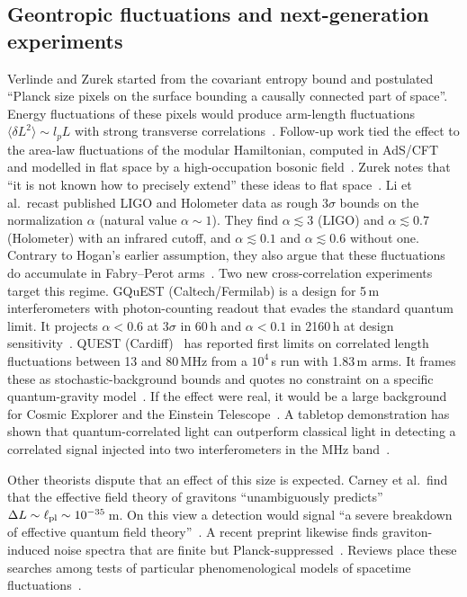 \subsection{Geontropic fluctuations and next-generation experiments}

Verlinde and Zurek started from the covariant entropy bound and postulated
``Planck size pixels on the surface bounding a causally connected part of
space''. Energy fluctuations of these pixels would produce arm-length
fluctuations $\langle\delta L^2\rangle\sim l_pL$ with strong transverse
correlations~\cite{Verlinde2021observational}. Follow-up work tied the effect to
the area-law fluctuations of the modular Hamiltonian, computed in AdS/CFT and
modelled in flat space by a high-occupation bosonic field~\cite{Verlinde2020spacetime,Zurek2022vacuum,Verlinde2022modular}.
Zurek notes that ``it is not known how to precisely extend'' these ideas to flat
space~\cite{Zurek2022vacuum}. Li et al.\ recast published LIGO and Holometer data
as rough $3\sigma$ bounds on the normalization $\alpha$ (natural value
$\alpha\sim1$). They find $\alpha\lesssim3$ (LIGO) and $\alpha\lesssim0.7$
(Holometer) with an infrared cutoff, and $\alpha\lesssim0.1$ and
$\alpha\lesssim0.6$ without one. Contrary to Hogan's earlier assumption, they
also argue that these fluctuations do accumulate in Fabry--Perot
arms~\cite{Li2023interferometer}. Two new cross-correlation experiments target
this regime. GQuEST (Caltech/Fermilab) is a design for 5\,m interferometers with
photon-counting readout that evades the standard quantum limit. It projects
$\alpha<0.6$ at $3\sigma$ in 60\,h and $\alpha<0.1$ in 2160\,h at design
sensitivity~\cite{Vermeulen2025photon}. QUEST (Cardiff)~\cite{Vermeulen2021experiment}
has reported first limits on correlated length fluctuations between 13 and
80\,MHz from a $10^4$\,s run with 1.83\,m arms. It frames these as
stochastic-background bounds and quotes no constraint on a specific
quantum-gravity model~\cite{Patra2025broadband}. If the effect were real, it
would be a large background for Cosmic Explorer and the Einstein
Telescope~\cite{Bub2023quantum}. A tabletop demonstration has shown that
quantum-correlated light can outperform classical light in detecting a correlated
signal injected into two interferometers in the MHz band~\cite{Pradyumna2020twin}.

Other theorists dispute that an effect of this size is expected. Carney et al.\
find that the effective field theory of gravitons ``unambiguously predicts''
$\Delta L\sim\ell_{\rm pl}\sim10^{-35}$\,m. On this view a detection would signal
``a severe breakdown of effective quantum field theory''~\cite{Carney2026response}.
A recent preprint likewise finds graviton-induced noise spectra that are finite
but Planck-suppressed~\cite{Freidel2026geometric}. Reviews place these searches
among tests of particular phenomenological models of spacetime
fluctuations~\cite{Carlip2023spacetime,Sharmila2026signatures}.

